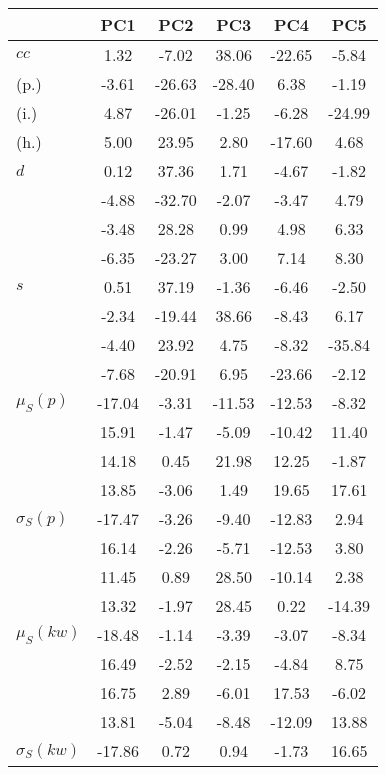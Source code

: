 \begin{table}[h!]
\begin{center}
\begin{tabular}{| l | c | c | c | c | c |}\hline
 & PC1 & PC2 & PC3 & PC4 & PC5 \\\hline
$cc$ & 1.32  & -7.02  & 38.06  & -22.65  & -5.84 \\\hline
(p.) & -3.61  & -26.63  & -28.40  & 6.38  & -1.19 \\\hline
(i.) & 4.87  & -26.01  & -1.25  & -6.28  & -24.99 \\\hline
(h.) & 5.00  & 23.95  & 2.80  & -17.60  & 4.68 \\\hline
$d$ & 0.12  & 37.36  & 1.71  & -4.67  & -1.82 \\\hline
 & -4.88  & -32.70  & -2.07  & -3.47  & 4.79 \\\hline
 & -3.48  & 28.28  & 0.99  & 4.98  & 6.33 \\\hline
 & -6.35  & -23.27  & 3.00  & 7.14  & 8.30 \\\hline
$s$ & 0.51  & 37.19  & -1.36  & -6.46  & -2.50 \\\hline
 & -2.34  & -19.44  & 38.66  & -8.43  & 6.17 \\\hline
 & -4.40  & 23.92  & 4.75  & -8.32  & -35.84 \\\hline
 & -7.68  & -20.91  & 6.95  & -23.66  & -2.12 \\\hline
$\mu_S(p)$ & -17.04  & -3.31  & -11.53  & -12.53  & -8.32 \\\hline
 & 15.91  & -1.47  & -5.09  & -10.42  & 11.40 \\\hline
 & 14.18  & 0.45  & 21.98  & 12.25  & -1.87 \\\hline
 & 13.85  & -3.06  & 1.49  & 19.65  & 17.61 \\\hline
$\sigma_S(p)$ & -17.47  & -3.26  & -9.40  & -12.83  & 2.94 \\\hline
 & 16.14  & -2.26  & -5.71  & -12.53  & 3.80 \\\hline
 & 11.45  & 0.89  & 28.50  & -10.14  & 2.38 \\\hline
 & 13.32  & -1.97  & 28.45  & 0.22  & -14.39 \\\hline
$\mu_S(kw)$ & -18.48  & -1.14  & -3.39  & -3.07  & -8.34 \\\hline
 & 16.49  & -2.52  & -2.15  & -4.84  & 8.75 \\\hline
 & 16.75  & 2.89  & -6.01  & 17.53  & -6.02 \\\hline
 & 13.81  & -5.04  & -8.48  & -12.09  & 13.88 \\\hline
$\sigma_S(kw)$ & -17.86  & 0.72  & 0.94  & -1.73  & 16.65 \\\hline

\end{tabular}
\end{center}
\end{table}
